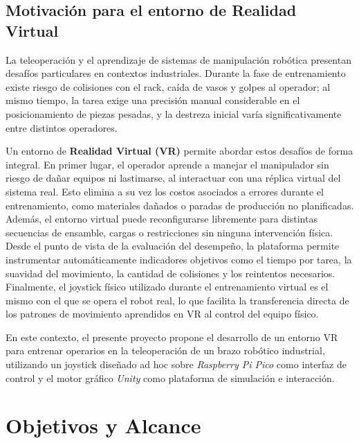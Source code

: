 \subsection{Motivación para el entorno de Realidad Virtual}

La teleoperación y el aprendizaje de sistemas de manipulación robótica presentan desafíos particulares en contextos industriales. Durante la fase de entrenamiento existe riesgo de colisiones con el rack, caída de vasos y golpes al operador; al mismo tiempo, la tarea exige una precisión manual considerable en el posicionamiento de piezas pesadas, y la destreza inicial varía significativamente entre distintos operadores.

Un entorno de \textbf{Realidad Virtual (VR)} permite abordar estos desafíos de forma integral. En primer lugar, el operador aprende a manejar el manipulador sin riesgo de dañar equipos ni lastimarse, al interactuar con una réplica virtual del sistema real. Esto elimina a su vez los costos asociados a errores durante el entrenamiento, como materiales dañados o paradas de producción no planificadas. Además, el entorno virtual puede reconfigurarse libremente para distintas secuencias de ensamble, cargas o restricciones sin ninguna intervención física. Desde el punto de vista de la evaluación del desempeño, la plataforma permite instrumentar automáticamente indicadores objetivos como el tiempo por tarea, la suavidad del movimiento, la cantidad de colisiones y los reintentos necesarios. Finalmente, el joystick físico utilizado durante el entrenamiento virtual es el mismo con el que se opera el robot real, lo que facilita la transferencia directa de los patrones de movimiento aprendidos en VR al control del equipo físico.

En este contexto, el presente proyecto propone el desarrollo de un entorno VR para entrenar operarios en la teleoperación de un brazo robótico industrial, utilizando un joystick diseñado ad hoc sobre \textit{Raspberry Pi Pico} como interfaz de control y el motor gráfico \textit{Unity} como plataforma de simulación e interacción.


\section{Objetivos y Alcance}

